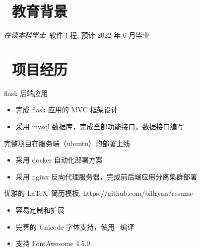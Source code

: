 \documentclass{resume}
\begin{document}


 
\section{\faGraduationCap\  教育背景}
\textit{在读本科学士}\ 软件工程, 预计 2022 年 6 月毕业

\section{\faUsers\ 项目经历}

\begin{onehalfspacing}
flask 后端应用
\begin{itemize}
  \item 完成 flask 应用的 MVC 框架设计
  \item 采用 mysql 数据库，完成全部功能接口，数据接口编写
\end{itemize}
完整项目在服务端（ubuntu）的部署上线
\begin{itemize}
  \item 采用 docker 自动化部署方案
  \item 采用 nginx 反向代理服务器，完成前后端应用分离集群部署
\end{itemize}
\end{onehalfspacing}

\begin{onehalfspacing}
优雅的 \LaTeX\ 简历模板, https://github.com/billryan/resume
\begin{itemize}
  \item 容易定制和扩展
  \item 完善的 Unicode 字体支持，使用 \XeLaTeX\ 编译
  \item 支持 FontAwesome 4.5.0
\end{itemize}
\end{onehalfspacing}

\end{document}
